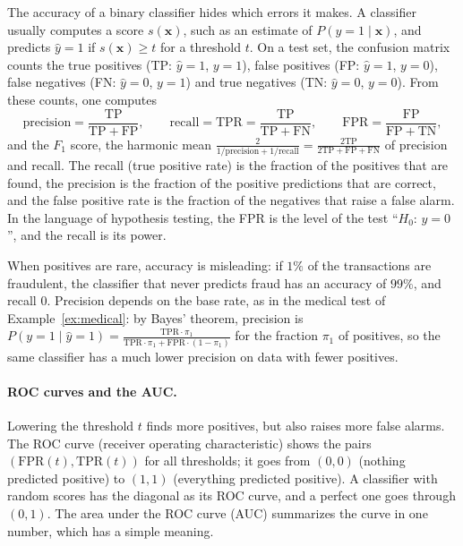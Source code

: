 \documentclass[11pt]{article}
\theoremstyle{definition}
\theoremstyle{plain}
\theoremstyle{remark}
\begin{document}
The accuracy of a binary classifier hides which errors it makes. A classifier usually computes a score $s(\mathbf{x})$, such as an estimate of $P(y = 1 \mid \mathbf{x})$, and predicts $\hat y = 1$ if $s(\mathbf{x}) \geq t$ for a threshold $t$. On a test set, the confusion matrix counts the true positives (TP: $\hat y = 1$, $y = 1$), false positives (FP: $\hat y = 1$, $y = 0$), false negatives (FN: $\hat y = 0$, $y = 1$) and true negatives (TN: $\hat y = 0$, $y = 0$). From these counts, one computes
\[\text{precision} = \frac{\mathrm{TP}}{\mathrm{TP} + \mathrm{FP}}, \qquad \text{recall} = \mathrm{TPR} = \frac{\mathrm{TP}}{\mathrm{TP} + \mathrm{FN}}, \qquad \mathrm{FPR} = \frac{\mathrm{FP}}{\mathrm{FP} + \mathrm{TN}},\]
and the $F_1$ score, the harmonic mean $\frac{2}{1/\text{precision} + 1/\text{recall}} = \frac{2\mathrm{TP}}{2\mathrm{TP} + \mathrm{FP} + \mathrm{FN}}$ of precision and recall. The recall (true positive rate) is the fraction of the positives that are found, the precision is the fraction of the positive predictions that are correct, and the false positive rate is the fraction of the negatives that raise a false alarm. In the language of hypothesis testing, the FPR is the level of the test ``$H_0$: $y = 0$'', and the recall is its power.

When positives are rare, accuracy is misleading: if $1\%$ of the transactions are fraudulent, the classifier that never predicts fraud has an accuracy of $99\%$, and recall $0$. Precision depends on the base rate, as in the medical test of Example~\ref{ex:medical}: by Bayes' theorem, precision is $P(y = 1 \mid \hat y = 1) = \frac{\mathrm{TPR}\cdot\pi_1}{\mathrm{TPR}\cdot\pi_1 + \mathrm{FPR}\cdot(1 - \pi_1)}$ for the fraction $\pi_1$ of positives, so the same classifier has a much lower precision on data with fewer positives.

\paragraph{ROC curves and the AUC.} Lowering the threshold $t$ finds more positives, but also raises more false alarms. The ROC curve (receiver operating characteristic) shows the pairs $(\mathrm{FPR}(t), \mathrm{TPR}(t))$ for all thresholds; it goes from $(0, 0)$ (nothing predicted positive) to $(1, 1)$ (everything predicted positive). A classifier with random scores has the diagonal as its ROC curve, and a perfect one goes through $(0, 1)$. The area under the ROC curve (AUC) summarizes the curve in one number, which has a simple meaning.
\end{document}
